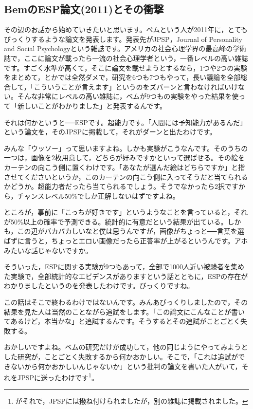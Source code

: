 \documentclass{ltjsbook}
\begin{document}
\subsection{BemのESP論文(2011)とその衝撃}
その辺のお話から始めていきたいと思います。ベムという人が2011年に，とてもびっくりするような論文を発表します。発表先がJPSP，Journal of Personality and Social Psychologyという雑誌です。アメリカの社会心理学界の最高峰の学術誌で，ここに論文が載ったら一流の社会心理学者という，一番レベルの高い雑誌です。すごく水準が高くて，そこに論文を載せようとするなら，1つや2つの実験をまとめて，とかでは全然ダメで，研究を6つも7つもやって，長い議論を全部総合して，「こういうことが言えます」というのをズバーンと言わなければいけない。そんな非常にレベルの高い雑誌に，ベムが9つもの実験をやった結果を使って「新しいことがわかりました」と発表するんです。

それは何かというと──ESPです。超能力です。「人間には予知能力があるんだ」という論文を，そのJPSPに掲載して，それがダーンと出たわけです。

みんな「ウッソー」って思いますよね。しかも実験がこうなんです。そのうちの一つは，画像を2枚用意して，どちらが好みですかといって選ばせる。その絵をカーテンの向こう側に置くわけです。「あなたが選んだ絵はどちらですか」と指させてくださいというか，このカーテンの向こう側に入ってそうだと当てられるかどうか。超能力者だったら当てられるでしょう。そうでなかったら2択ですから，チャンスレベル50\%でしか正解しないはずですよね。

ところが，事前に「こっちが好きです」というようなことを言っていると，それが50\%以上の確率で予測できる。統計的に有意だという結果が出ている。しかも，この辺がバカバカしいなと僕は思うんですが，画像がちょっと──言葉を選ばずに言うと，ちょっとエロい画像だったら正答率が上がるというんです。アホみたいな話じゃないですか。

そういった，ESPに関する実験が9つもあって，全部で1000人近い被験者を集めた実験で，全部統計的なエビデンスがありますという話とともに，ESPの存在がわかりましたというのを発表したわけです。びっくりですね。

この話はそこで終わるわけではないんです。みんあびっくりしましたので，その結果を見た人は当然のことながら追試をします。「この論文にこんなことが書いてあるけど，本当かな」と追試するんです。そうするとその追試がことごとく失敗する。

おかしいですよね。ベムの研究だけが成功して，他の同じようにやってみようとした研究が，ことごとく失敗するから何かおかしい。そこで，「これは追試ができないから何かおかしいんじゃないか」という批判の論文を書いた人がいて，それをJPSPに送ったわけです\footnote{\textcite{Ritchie2012}がそれで，JPSPには撥ね付けられましたが，別の雑誌に掲載されました。}。
\end{document}

